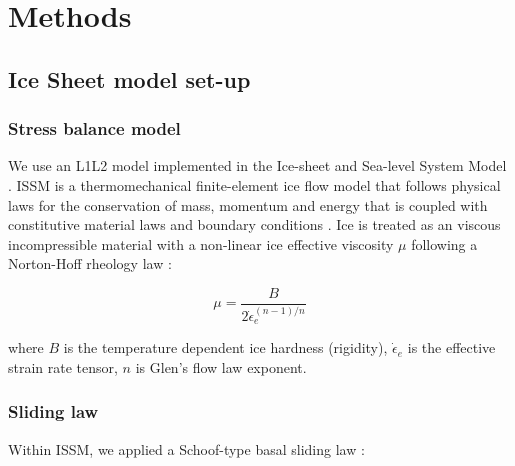 \clearpage
\section{Methods} \label{sec:methods}

\subsection{Ice Sheet model set-up}


\subsubsection{Stress balance model}

We use an L1L2 model \citep{Hindmarshnumericalcomparisonapproximations2004,SchoofThinFilmFlowsWall2010} implemented in the Ice-sheet and Sea-level System Model \citep[\gls{ISSM}, version 4.18;][]{LarourContinentalscalehigh2012}.
\gls{ISSM} is a thermomechanical finite-element ice flow model that follows physical laws for the conservation of mass, momentum and energy that is coupled with constitutive material laws and boundary conditions \citep{LarourContinentalscalehigh2012}.
Ice is treated as an viscous incompressible material \citep{Cuffeyphysicsglaciers2010} with a non-linear ice effective viscosity $\mu$ following a Norton-Hoff rheology law \citep[Glen's flow law,][]{Glencreeppolycrystallineice1955}:

\begin{equation}
  \mu = \frac{B}{2 \dot{\epsilon}_e^{(n-1)/n}}
\end{equation}

where $B$ is the temperature dependent ice hardness (rigidity), $\dot{\epsilon}_e$ is the effective strain rate tensor, $n$ is Glen's flow law exponent.

\subsubsection{Sliding law}

Within \gls{ISSM}, we applied a Schoof-type basal sliding law \citep{Schoofeffectcavitationglacier2005}:


